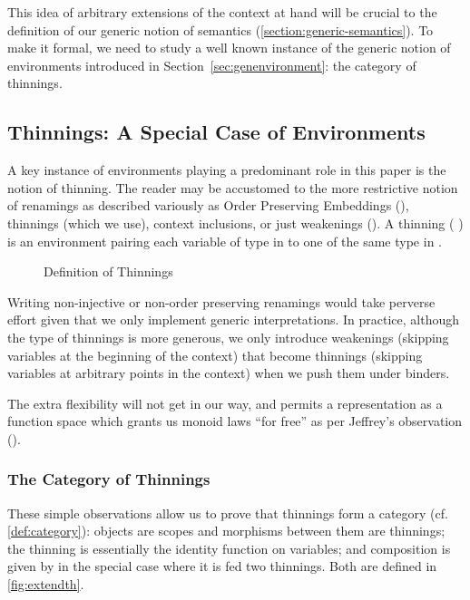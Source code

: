 This idea of arbitrary extensions of the context at hand will be crucial
to the definition of our generic notion of
semantics (\cref{section:generic-semantics}). To make it formal,
we need to study a well known instance
of the generic notion of environments introduced in
Section~\ref{sec:genenvironment}: the category of thinnings.

\subsection{Thinnings: A Special Case of Environments}
\label{sec:categoryrenamings}

A key instance of environments playing a predominant role in this paper is the
notion of thinning. The reader may be accustomed to the more restrictive notion
of renamings as described variously as Order Preserving Embeddings
(\cite{chapman2009type}), thinnings (which we use), context inclusions,
or just weakenings (\cite{altenkirch1995categorical}). A thinning
(  ) is an environment pairing each variable
of type  in  to one of the same type in .

\begin{figure}[h]
\caption{Definition of Thinnings\label{fig:thinnings}}
\end{figure}

Writing non-injective or non-order preserving renamings would take
perverse effort given that we only implement generic interpretations.
In practice, although the type of thinnings is more generous, we
only introduce weakenings (skipping variables at the beginning of
the context) that become thinnings (skipping variables at arbitrary
points in the context) when we push them under binders.

The extra flexibility will not get in our way, and permits a
representation as a function space which grants us monoid laws
``for free'' as per Jeffrey's observation (\citeyear{jeffrey2011assoc}).

\subsubsection{The Category of Thinnings}
\label{sec:categorythinnings}

These simple observations allow us to prove that thinnings form a
category (cf. \cref{def:category}): objects are scopes and morphisms
between them are thinnings; the  thinning is essentially
the identity function on variables; and composition is given by
 in the special case where it is fed two thinnings.
Both are defined in \cref{fig:extendth}.

